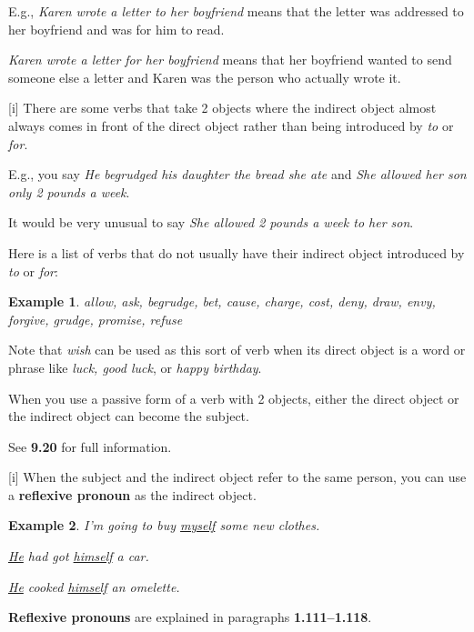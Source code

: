 \documentclass[oneside]{book}
\numberwithin{equation}{section}
\newtheorem{example}{Example}[section]
\begin{document}
E.g., \textit{Karen wrote a letter to her boyfriend} means that the letter was addressed to her boyfriend and was for him to read.

\textit{Karen wrote a letter for her boyfriend} means that her boyfriend wanted to send someone else a letter and Karen was the person who actually wrote it.

%
\noindent{} [i] There are some verbs that take 2 objects where the indirect object almost always comes in front of the direct object rather than being introduced by \textit{to} or \textit{for}.

E.g., you say \textit{He begrudged his daughter the bread she ate} and \textit{She allowed her son only 2 pounds a week}.

It would be very unusual to say \textit{She allowed 2 pounds a week to her son}.

%
Here is a list of verbs that do not usually have their indirect object introduced by \textit{to} or \textit{for}:
\begin{example}
    allow, ask, begrudge, bet, cause, charge, cost, deny, draw, envy, forgive, grudge, promise, refuse
\end{example}
Note that \textit{wish} can be used as this sort of verb when its direct object is a word or phrase like \textit{luck, good luck}, or \textit{happy birthday}.

%
\noindent{} When you use a passive form of a verb with 2 objects, either the direct object or the indirect object can become the subject.

See \textbf{9.20} for full information.

%
\noindent{} [i] When the subject and the indirect object refer to the same person, you can use a \textbf{reflexive pronoun} as the indirect object.
\begin{example}
    I'm going to buy \underline{myself} some new clothes.
    
    \underline{He} had got \underline{himself} a car.
    
    \underline{He} cooked \underline{himself} an omelette.
\end{example}
\textbf{Reflexive pronouns} are explained in paragraphs \textbf{1.111--1.118}.
\end{document}
